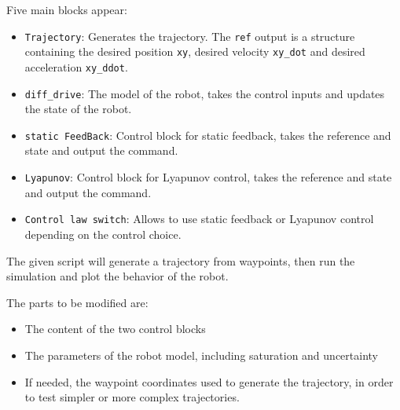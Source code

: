 \documentclass{ecnreport}
\begin{document}
\newpage

Five main blocks appear:
\begin{itemize}
 \item \texttt{Trajectory}: Generates the trajectory. The \texttt{ref} output is a structure containing the desired position \texttt{xy}, desired velocity \texttt{xy\_dot} and desired acceleration \texttt{xy\_ddot}.
 \item \texttt{diff\_drive}: The model of the robot, takes the control inputs and updates the state of the robot.
 \item \texttt{static FeedBack}: Control block for static feedback, takes the reference and state and output the command.
 \item \texttt{Lyapunov}: Control block for Lyapunov control, takes the reference and state and output the command.
 \item \texttt{Control law switch}: Allows to use static feedback or Lyapunov control depending on the control choice.
\end{itemize}

The given script will generate a trajectory from waypoints, then run the simulation and plot the behavior of the robot.

The parts to be modified are:
\begin{itemize}
 \item The content of the two control blocks
 \item The parameters of the robot model, including saturation and uncertainty
 \item If needed, the waypoint coordinates used to generate the trajectory, in order to test simpler or more complex trajectories.
\end{itemize}
\end{document}

